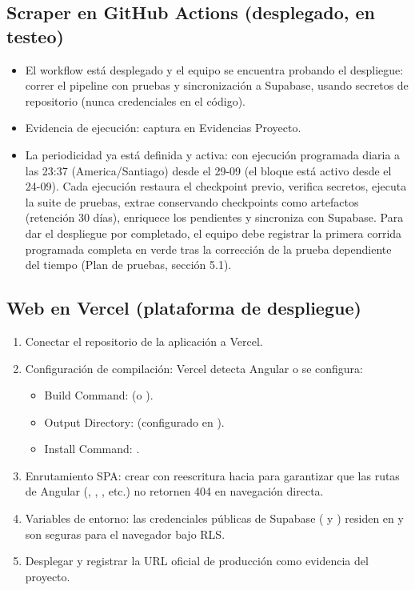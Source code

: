 \documentclass[11pt,a4paper]{article}
\begin{document}
\subsection{Scraper en GitHub Actions (desplegado, en testeo)}

\begin{itemize}
  \item El workflow está desplegado y el equipo se encuentra probando el
        despliegue: correr el pipeline con pruebas y sincronización a
        Supabase, usando secretos de repositorio (nunca credenciales en el
        código).
  \item Evidencia de ejecución: captura  en Evidencias Proyecto.
  \item La periodicidad ya está definida y activa:  con ejecución
        programada diaria a las 23:37 (America/Santiago) desde el 29-09 (el bloque
         está activo desde el 24-09). Cada ejecución restaura el
        checkpoint previo, verifica secretos, ejecuta la suite de pruebas, extrae
        conservando checkpoints como artefactos (retención 30 días), enriquece los
        pendientes y sincroniza con Supabase. Para dar el despliegue por completado,
        el equipo debe registrar la primera corrida programada completa en verde tras
        la corrección de la prueba dependiente del tiempo (Plan de pruebas, sección 5.1).
\end{itemize}

\subsection{Web en Vercel (plataforma de despliegue)}

\begin{enumerate}
  \item Conectar el repositorio de la aplicación a Vercel.
  \item Configuración de compilación: Vercel detecta Angular o se configura:
        \begin{itemize}
          \item Build Command:  (o ).
          \item Output Directory:  (configurado en ).
          \item Install Command: .
        \end{itemize}
  \item Enrutamiento SPA: crear  con reescritura hacia 
        para garantizar que las rutas de Angular (, ,
        , etc.) no retornen 404 en navegación directa.
  \item Variables de entorno: las credenciales públicas de Supabase ( y
        ) residen en  y son seguras para el navegador bajo RLS.
  \item Desplegar y registrar la URL oficial de producción como evidencia del proyecto.
\end{enumerate}
\end{document}
